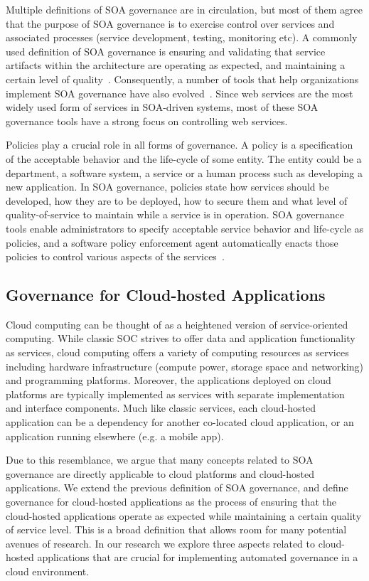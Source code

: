 Multiple definitions of SOA governance
are in circulation, but most of them agree that the purpose of SOA governance is to exercise control over
services and associated processes (service development, testing, monitoring etc). A commonly used definition
of SOA governance is ensuring and validating that service artifacts within the architecture are operating
as expected, and maintaining a certain level of quality~\cite{gartner-soa-gov}.
Consequently, a number of tools that help organizations implement SOA governance 
have also evolved~\cite{Schepers:2008:LAS:1363686.1363932,4730489,6478236,5577268}.
Since web services are the most widely used form of services in SOA-driven systems, most of these
SOA governance tools have a strong focus on controlling web services. 

Policies play a crucial role in all forms of governance. A policy is a specification of the acceptable behavior
and the life-cycle of some entity. The entity could be a department, a software system, a service or a 
human process such as developing
a new application. In SOA governance, policies state how services should be developed, how they are to be
deployed, how to secure them and what level of quality-of-service to maintain while a service is in operation.
SOA governance tools enable administrators to specify acceptable service behavior and life-cycle as policies, and
a software policy enforcement agent automatically enacts those policies to control various aspects of the 
services~\cite{5976827,4483228,4279691}. 

\subsection{Governance for Cloud-hosted Applications}
Cloud computing can be thought of as a heightened version of service-oriented computing. While classic
SOC strives to offer data and application functionality as services, cloud computing offers a variety
of computing resources
as services including hardware infrastructure (compute power, storage space and networking) and programming
platforms. Moreover, the applications deployed on cloud platforms are typically implemented as services with
separate implementation and interface components. 
Much like classic services, each cloud-hosted application 
can be a dependency for another
co-located cloud application, or an application running elsewhere (e.g. a mobile app). 

Due to this resemblance, we argue that many concepts related to SOA governance are
directly applicable to cloud platforms and cloud-hosted applications. 
We extend the previous definition of SOA governance, and define governance for cloud-hosted applications
as the process of ensuring that the cloud-hosted applications
operate as expected while maintaining a certain quality of service level.
This is a broad definition that allows room for many potential avenues of research.
In our research we explore three aspects related to cloud-hosted applications that are crucial
for implementing automated governance in a cloud environment.

